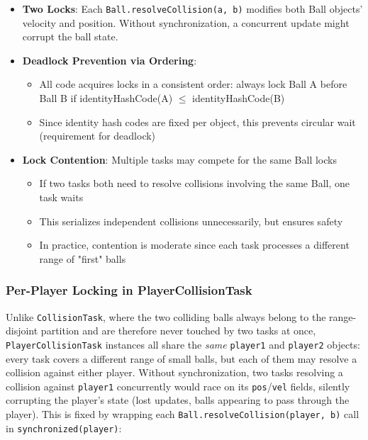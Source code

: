 \documentclass[12pt,a4paper]{article}
\begin{document}
\begin{itemize}
    \item \textbf{Two Locks}: Each \texttt{Ball.resolveCollision(a, b)} modifies both Ball objects' velocity and position. Without synchronization, a concurrent update might corrupt the ball state.
    \item \textbf{Deadlock Prevention via Ordering}:
    \begin{itemize}
        \item All code acquires locks in a consistent order: always lock Ball A before Ball B if identityHashCode(A) $\leq$ identityHashCode(B)
        \item Since identity hash codes are fixed per object, this prevents circular wait (requirement for deadlock)
    \end{itemize}
    \item \textbf{Lock Contention}: Multiple tasks may compete for the same Ball locks
    \begin{itemize}
        \item If two tasks both need to resolve collisions involving the same Ball, one task waits
        \item This serializes independent collisions unnecessarily, but ensures safety
        \item In practice, contention is moderate since each task processes a different range of "first" balls
    \end{itemize}
\end{itemize}

\subsubsection{Per-Player Locking in PlayerCollisionTask}
\label{sec:player-locking}

Unlike \texttt{CollisionTask}, where the two colliding balls always belong
to the range-disjoint partition and are therefore never touched by two
tasks at once, \texttt{PlayerCollisionTask} instances all share the
\textit{same} \texttt{player1} and \texttt{player2} objects: every task
covers a different range of small balls, but each of them may resolve a
collision against either player. Without synchronization, two tasks
resolving a collision against \texttt{player1} concurrently would race on
its \texttt{pos}/\texttt{vel} fields, silently corrupting the player's
state (lost updates, balls appearing to pass through the player). This is
fixed by wrapping each \texttt{Ball.resolveCollision(player, b)} call in
\texttt{synchronized(player)}:
\end{document}
